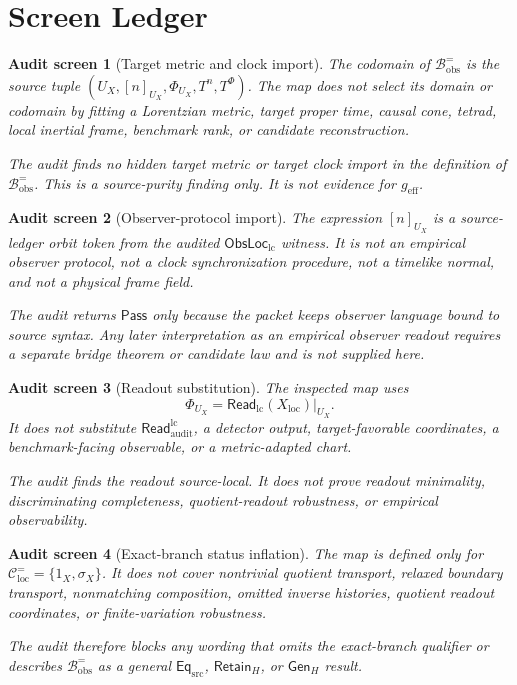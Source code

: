 \documentclass[11pt]{article}
\newcommand{\EqSrc}{\mathsf{Eq}_{\mathrm{src}}}
\newcommand{\ReadLC}{\mathsf{Read}_{\mathrm{lc}}}
\newcommand{\ReadAudit}{\mathsf{Read}_{\mathrm{audit}}^{\mathrm{lc}}}
\newcommand{\ObsLocLC}{\mathsf{ObsLoc}_{\mathrm{lc}}}
\newcommand{\RetainH}{\mathsf{Retain}_{H}}
\newcommand{\GenH}{\mathsf{Gen}_{H}}
\newcommand{\Bobs}{\mathcal{B}^{=}_{\mathrm{obs}}}
\newcommand{\geff}{g_{\mathrm{eff}}}
\newcommand{\Pass}{\mathsf{Pass}}
\newtheorem{screen}{Audit screen}
\begin{document}
\section{Screen Ledger}

\begin{screen}[Target metric and clock import]
The codomain of \(\Bobs\) is the source tuple
\((U_X,[n]_{U_X},\Phi_{U_X},T^n,T^\Phi)\). The map does not select its
domain or codomain by fitting a Lorentzian metric, target proper time,
causal cone, tetrad, local inertial frame, benchmark rank, or
candidate reconstruction.

The audit finds no hidden target metric or target clock import in the
definition of \(\Bobs\). This is a source-purity finding only. It is
not evidence for \(\geff\).
\end{screen}

\begin{screen}[Observer-protocol import]
The expression \([n]_{U_X}\) is a source-ledger orbit token from the
audited \(\ObsLocLC\) witness. It is not an empirical observer
protocol, not a clock synchronization procedure, not a timelike
normal, and not a physical frame field.

The audit returns \(\Pass\) only because the packet keeps observer
language bound to source syntax. Any later interpretation as an
empirical observer readout requires a separate bridge theorem or
candidate law and is not supplied here.
\end{screen}

\begin{screen}[Readout substitution]
The inspected map uses
\[
    \Phi_{U_X}=\ReadLC(X_{\mathrm{loc}})|_{U_X}.
\]
It does not substitute \(\ReadAudit\), a detector output,
target-favorable coordinates, a benchmark-facing observable, or a
metric-adapted chart.

The audit finds the readout source-local. It does not prove readout
minimality, discriminating completeness, quotient-readout robustness,
or empirical observability.
\end{screen}

\begin{screen}[Exact-branch status inflation]
The map is defined only for
\(\mathcal{C}^{=}_{\mathrm{loc}}=\{1_X,\sigma_X\}\). It does not cover
nontrivial quotient transport, relaxed boundary transport,
nonmatching composition, omitted inverse histories, quotient readout
coordinates, or finite-variation robustness.

The audit therefore blocks any wording that omits the exact-branch
qualifier or describes \(\Bobs\) as a general \(\EqSrc\), \(\RetainH\),
or \(\GenH\) result.
\end{screen}
\end{document}
